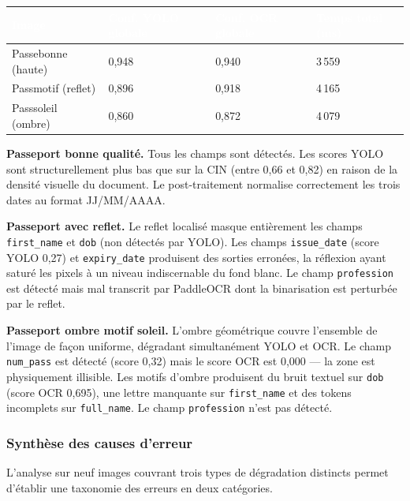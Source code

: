 \renewcommand{\arraystretch}{1.25}
\begin{center}
  \begin{tabular}{|p{4cm}|p{3.5cm}|p{3.5cm}|p{3cm}|}
    \hline
    \rowcolor{bleu_principal}
    \textcolor{white}{\textbf{Image}} & \textcolor{white}{\textbf{Conf. YOLO globale}} & \textcolor{white}{\textbf{Conf. OCR globale}} & \textcolor{white}{\textbf{Temps total (ms)}} \\
    \hline
    Passebonne (haute)  & 0,948 & 0,940 & 3\,559 \\ \hline
    Passmotif (reflet)  & 0,896 & 0,918 & 4\,165 \\ \hline
    Passsoleil (ombre)  & 0,860 & 0,872 & 4\,079 \\ \hline
  \end{tabular}
  \label{tab:recap-passeport}
\end{center}

\textbf{Passeport bonne qualité.} Tous les champs sont détectés. Les scores YOLO sont structurellement plus bas que sur la CIN (entre 0,66 et 0,82) en raison de la densité visuelle du document. Le post-traitement normalise correctement les trois dates au format JJ/MM/AAAA.

\textbf{Passeport avec reflet.} Le reflet localisé masque entièrement les champs \texttt{first\_name} et \texttt{dob} (non détectés par YOLO). Les champs \texttt{issue\_date} (score YOLO 0,27) et \texttt{expiry\_date} produisent des sorties erronées, la réflexion ayant saturé les pixels à un niveau indiscernable du fond blanc. Le champ \texttt{profession} est détecté mais mal transcrit par PaddleOCR dont la binarisation est perturbée par le reflet.

\textbf{Passeport ombre motif soleil.} L'ombre géométrique couvre l'ensemble de l'image de façon uniforme, dégradant simultanément YOLO et OCR. Le champ \texttt{num\_pass} est détecté (score 0,32) mais le score OCR est 0,000 — la zone est physiquement illisible. Les motifs d'ombre produisent du bruit textuel sur \texttt{dob} (score OCR 0,695), une lettre manquante sur \texttt{first\_name} et des tokens incomplets sur \texttt{full\_name}. Le champ \texttt{profession} n'est pas détecté.

\subsubsection{Synthèse des causes d'erreur}

L'analyse sur neuf images couvrant trois types de dégradation distincts permet d'établir une taxonomie des erreurs en deux catégories.

